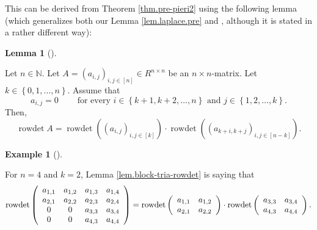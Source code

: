\documentclass[numbers=enddot,12pt,final,onecolumn,notitlepage,english]{scrartcl}%
\theoremstyle{definition}
\newtheorem{lem}[theo]{Lemma}
\newenvironment{lemma}[1][]
{\begin{lem}[#1]\begin{leftbar}}
{\end{leftbar}\end{lem}}
\newtheorem{exam}[theo]{Example}
\newenvironment{example}[1][]
{\begin{exam}[#1]\begin{leftbar}}
{\end{leftbar}\end{exam}}
\begin{document}
This can be derived from Theorem \ref{thm.pre-pieri2} using the following
lemma (which generalizes both our Lemma \ref{lem.laplace.pre} and
\cite[Exercise 6.29]{detnotes}, although it is stated in a rather different way):

\begin{lemma}
\label{lem.block-tria-rowdet}Let $n\in\mathbb{N}$. Let $A=\left(
a_{i,j}\right)  _{i,j\in\left[  n\right]  }\in R^{n\times n}$ be an $n\times
n$-matrix. Let $k\in\left\{  0,1,\ldots,n\right\}  $. Assume that%
\[
a_{i,j}=0\ \ \ \ \ \ \ \ \ \ \text{for every }i\in\left\{  k+1,k+2,\ldots
,n\right\}  \text{ and }j\in\left\{  1,2,\ldots,k\right\}  .
\]
Then,
\[
\operatorname*{rowdet}A=\operatorname*{rowdet}\left(  \left(  a_{i,j}\right)
_{i,j\in\left[  k\right]  }\right)  \cdot\operatorname*{rowdet}\left(  \left(
a_{k+i,k+j}\right)  _{i,j\in\left[  n-k\right]  }\right)  .
\]

\end{lemma}

\begin{example}
For $n=4$ and $k=2$, Lemma \ref{lem.block-tria-rowdet} is saying that%
\[
\operatorname*{rowdet}\left(
\begin{array}
[c]{cccc}%
a_{1,1} & a_{1,2} & a_{1,3} & a_{1,4}\\
a_{2,1} & a_{2,2} & a_{2,3} & a_{2,4}\\
0 & 0 & a_{3,3} & a_{3,4}\\
0 & 0 & a_{4,3} & a_{4,4}%
\end{array}
\right)  =\operatorname*{rowdet}\left(
\begin{array}
[c]{cc}%
a_{1,1} & a_{1,2}\\
a_{2,1} & a_{2,2}%
\end{array}
\right)  \cdot\operatorname*{rowdet}\left(
\begin{array}
[c]{cc}%
a_{3,3} & a_{3,4}\\
a_{4,3} & a_{4,4}%
\end{array}
\right)  .
\]

\end{example}
\end{document}
